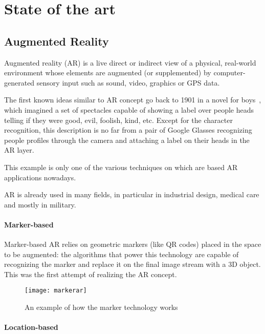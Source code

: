 \chapter{State of the art}

	\section{Augmented Reality}
	
		\begin{quoting}
			Augmented reality (AR) is a live direct or indirect view of a physical, real-world environment whose elements are augmented (or supplemented) by computer-generated sensory input such as sound, video, graphics or GPS data.~\cite{wiki:ar}
		\end{quoting}
		
		The first known ideas similar to AR concept go back to 1901 in a novel for boys~\cite{baum:master}, which imagined a set of spectacles capable of showing a label over people heads telling if they were good, evil, foolish, kind, etc.
		Except for the character recognition, this description is no far from a pair of Google Glasses recognizing people profiles through the camera and attaching a label on their heads in the AR layer.
		
		This example is only one of the various techniques on which are based AR applications nowadays.
		
		AR is already used in many fields, in particular in industrial design, medical care and mostly in military.
		
		\subsubsection{Marker-based}
			
			Marker-based AR relies on geometric markers (like QR codes) placed in the space to be augmented: the algorithms that power this technology are capable of recognizing the marker and replace it on the final image stream with a 3D object.
			This was the first attempt of realizing the AR concept.
			
			\begin{figure}
				\centering
				\texttt{[image: markerar]}
				\caption{An example of how the marker technology works}
			\end{figure}
		
		\subsubsection{Location-based}
		
